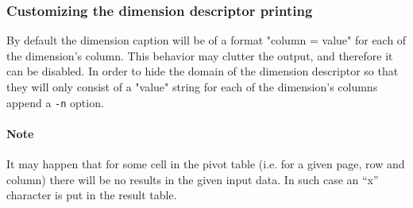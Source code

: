 \documentclass{report}
\begin{document}
	\subsubsection{Customizing the dimension descriptor printing}
	By default the dimension caption will be of a format "column = value" for each
	of the dimension's column. This behavior may clutter the output, and therefore
	it can be disabled. In order to hide the domain of the dimension descriptor so that
	they will only consist of a "value" string for each of the dimension's columns
	append a \texttt{-n} option.

	\paragraph{Note}
	It may happen that for some cell in the pivot table (i.e. for a given page, row
	and column) there will be no results in the given input data. In such case an
	``x'' character is put in the result table.
\end{document}
